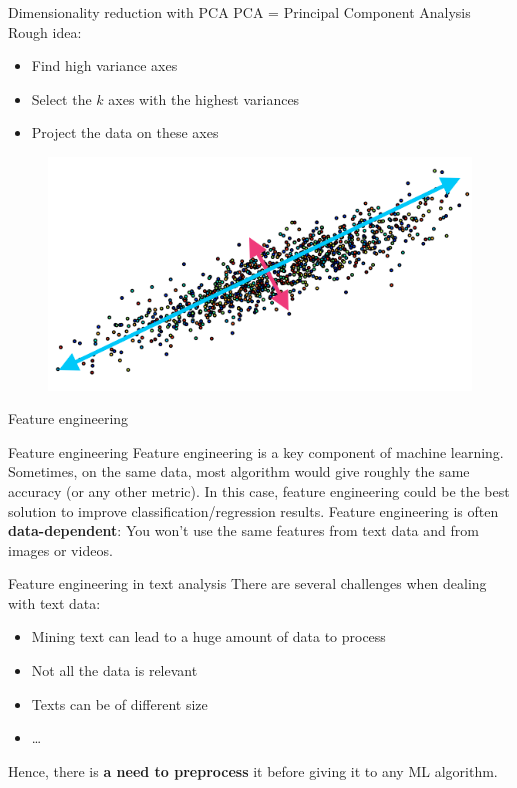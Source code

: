 \documentclass{beamer}
\newcommand{\1}[1]{\mathbbm{1}\left[#1\right]}
\begin{document}
\begin{frame}{Dimensionality reduction with PCA}
PCA = Principal Component Analysis
\vfill
\pause
Rough idea:
\begin{itemize}
	\item Find high variance axes
	\item Select the $k$ axes with the highest variances
	\item Project the data on these axes
\end{itemize}
\vfill
\pause
\begin{figure}
\centering
\includegraphics[width=\textwidth]{images/pca_illustration.png}
\end{figure}
\end{frame}

\begin{frame}
\begin{center}
\Huge{Feature engineering}
\end{center}
\end{frame}

\begin{frame}{Feature engineering}
Feature engineering is a key component of machine learning.
\vfill
\pause
Sometimes, on the same data, most algorithm would give roughly the same accuracy (or any other metric). In this case, feature engineering could be the best solution to improve classification/regression results.
\vfill
\pause 
Feature engineering is often \textbf{data-dependent}: You won't use the same features from text data and from images or videos.
\end{frame}

\begin{frame}{Feature engineering in text analysis}
There are several challenges when dealing with text data:
\begin{itemize}
	\item Mining text can lead to a huge amount of data to process
	\item Not all the data is relevant 
	\item Texts can be of different size
	\item \ldots
\end{itemize}
\pause
\vfill
Hence, there is \textbf{a need to preprocess} it before giving it to any ML algorithm.
\end{frame}
\end{document}
